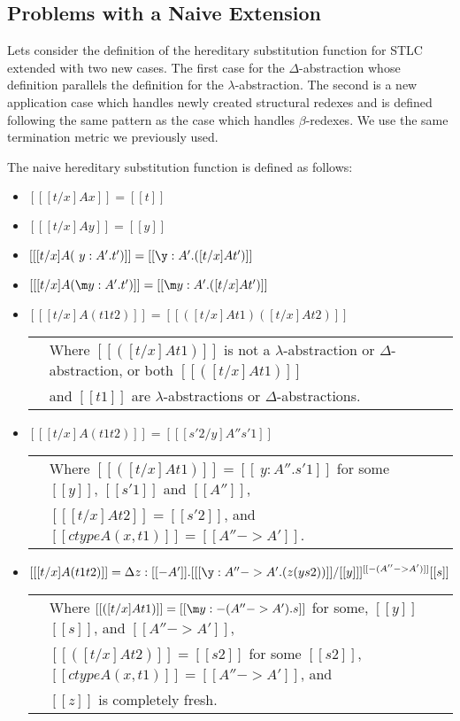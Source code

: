 \subsection{Problems with a Naive Extension}
\label{subsec:the_naive_extension}
Lets consider the definition of the hereditary substitution function
for STLC extended with two new cases. The first case for the $\Delta$-abstraction
whose definition parallels the definition for the
$\lambda$-abstraction.  The second is a new application case which
handles newly created structural redexes and is defined following the
same pattern as the case which handles $\beta$-redexes.  We use the same termination
metric we previously used. 
\begin{definition}
  \label{def:hereditary_substitution_function}
  The naive hereditary substitution function is defined as follows:
  \begin{itemize}
  \item[] $[[ [t/x] A x]] = [[t]]$
  \item[] $[[ [t/x] A y]] = [[y]]$

  \item[] $[[ [t/x] A (\ y:A'.t')]] = [[\y:A'.([t/x ] A t')]]$
  \item[] $[[ [t/x] A (\m y:A'.t')]] = [[\m y:A'.([t/x] A t')]]$

  \item[] $[[ [t/x] A (t1 t2)]] = [[([t/x] A t1) ([t/x] A t2)]]$\\
    \begin{tabular}{lll}
      & Where $[[([t/x] A t1)]]$ is not a $\lambda$-abstraction or $\Delta$-abstraction,  or both $[[([t/x] A t1)]]$ \\
      & and  $[[t1]]$ are $\lambda$-abstractions or $\Delta$-abstractions.\\
    \end{tabular}

  \item[] $[[ [t/x] A (t1 t2)]] = [[ [s'2/y] A'' s'1]]$\\
    \begin{tabular}{lll}
      & Where $[[([t/x] A t1)]] = [[\ y:A''.s'1]]$ for some $[[y]]$, $[[s'1]]$ and $[[A'']]$, \\
      & $[[ [t/x] A t2]] = [[s'2]]$, and $[[ctype A (x,t1)]] = [[A'' -> A']]$. \\
    \end{tabular}

  \item[] $[[ [t/x] A (t1 t2)]] = \Delta z:[[{-A'}]].[ [[\y:A'' -> A'.(z (y s2))]]/[[y]] ]^{[[{-(A''->A')}]]} [[s]]$\\
    \begin{tabular}{lll}
      & Where $[[([t/x] A t1)]] = [[\m y:{-(A''->A')}.s]]$ for some, $[[y]]$ $[[s]]$, 
      and $[[A'' -> A']]$, \\      
      & $[[([t/x] A t2)]] = [[s2]]$ for some $[[s2]]$, $[[ctype A (x,t1)]] = [[A'' -> A']]$, and \\
      & $[[z]]$ is completely fresh.
    \end{tabular}  
  \end{itemize}
\end{definition}

